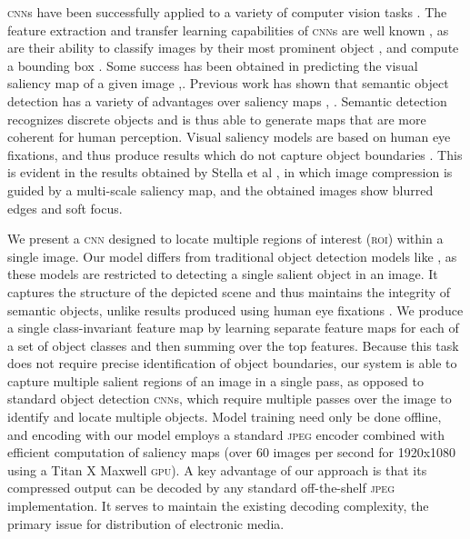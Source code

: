 \textsc{cnn}s have been successfully applied to a variety of computer vision tasks \cite{krizhevsky2012imagenet}.
The feature extraction and transfer learning capabilities of \textsc{cnn}s are well known \cite{zeiler2014visualizing}, as are their ability to classify images by their most prominent object \cite{he2015deep}, and compute a bounding box \cite{girshick2014rich}.
Some success has been obtained in predicting the visual saliency map of a given image \cite{jiang2015salicon},\cite{kummerer2014deep}.
Previous work has shown that semantic object detection has a variety of advantages over saliency maps \cite{mnih2014recurrent}, \cite{zund2013content}.
Semantic detection recognizes discrete objects and is thus able to generate maps that are more coherent for human perception.
Visual saliency models are based on human eye fixations, and thus produce results which do not capture object boundaries \cite{kummerer2014deep}.
This is evident in the results obtained by Stella et al \cite{stella2009image}, in which image compression is guided by a multi-scale saliency map, and the obtained images show blurred edges and soft focus.

We present a \textsc{cnn} designed to locate multiple regions of interest (\textsc{roi}) within a single image.
Our model differs from traditional object detection models like \cite{dai2016r}, \cite{girshick2014rich} as these models are restricted to detecting a single salient object in an image.
It captures the structure of the depicted scene and thus maintains the integrity of semantic objects, unlike results produced using human eye fixations \cite{liu2015predicting}.
We produce a single class-invariant feature map by learning separate feature maps for each of a set of object classes and then summing over the top features.
Because this task does not require precise identification of object boundaries, our system is able to capture multiple salient regions of an image in a single pass, as opposed to standard object detection \textsc{cnn}s, which require multiple passes over the image to identify and locate multiple objects.
Model training need only be done offline, and encoding with our model employs a standard \textsc{jpeg} encoder combined with efficient computation of saliency maps (over 60 images per second for 1920x1080 using a Titan X Maxwell \textsc{gpu}).
A key advantage of our approach is that its compressed output can be decoded by any standard off-the-shelf \textsc{jpeg} implementation.  It serves to maintain the existing decoding complexity, the primary issue for distribution of electronic media.


